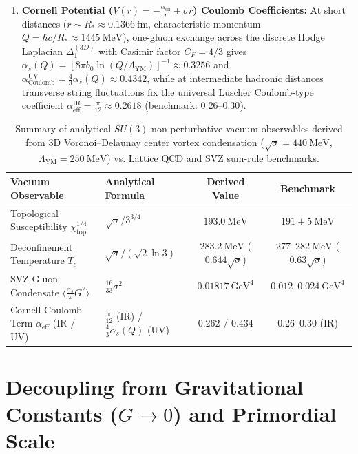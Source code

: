 \documentclass[11pt, a4paper]{article}
\theoremstyle{definition}
\theoremstyle{remark}
\begin{document}
\begin{enumerate}
  \item \textbf{Cornell Potential ($V(r) = -\frac{\alpha_{\mathrm{eff}}}{r} + \sigma r$) Coulomb Coefficients:}
  At short distances ($r \sim R_{*} \approx 0.1366~\mathrm{fm}$, characteristic momentum $Q = \hbar c/R_{*} \approx 1445~\mathrm{MeV}$), one-gluon exchange across the discrete Hodge Laplacian $\Delta_{1}^{(3D)}$ with Casimir factor $C_{F} = 4/3$ gives $\alpha_{s}(Q) = [8\pi b_{0}\ln(Q/\Lambda_{\mathrm{YM}})]^{-1} \approx 0.3256$ and $\alpha_{\mathrm{Coulomb}}^{\mathrm{UV}} = \frac{4}{3}\alpha_{s}(Q) \approx 0.4342$, while at intermediate hadronic distances transverse string fluctuations fix the universal L\"uscher Coulomb-type coefficient $\alpha_{\mathrm{eff}}^{\mathrm{IR}} = \frac{\pi}{12} \approx 0.2618$ (benchmark: $0.26\text{--}0.30$).
\end{enumerate}

\begin{table}[h!]
\centering
\caption{Summary of analytical $SU(3)$ non-perturbative vacuum observables derived from 3D Voronoi--Delaunay center vortex condensation ($\sqrt{\sigma} = 440~\mathrm{MeV}$, $\Lambda_{\mathrm{YM}} = 250~\mathrm{MeV}$) vs. Lattice QCD and SVZ sum-rule benchmarks.}
\vspace{0.5em}
\begin{tabular}{llcc}
\toprule
\textbf{Vacuum Observable} & \textbf{Analytical Formula} & \textbf{Derived Value} & \textbf{Benchmark} \\
\midrule
Topological Susceptibility $\chi_{\mathrm{top}}^{1/4}$ & $\sqrt{\sigma} / 3^{3/4}$ & $193.0~\mathrm{MeV}$ & $191 \pm 5~\mathrm{MeV}$ \\
Deconfinement Temperature $T_{c}$ & $\sqrt{\sigma} / (\sqrt{2}\ln 3)$ & $283.2~\mathrm{MeV}$ ($0.644\sqrt{\sigma}$) & $277\text{--}282~\mathrm{MeV}$ ($0.63\sqrt{\sigma}$) \\
SVZ Gluon Condensate $\langle \frac{\alpha_{s}}{\pi}G^{2}\rangle$ & $\frac{16}{33}\sigma^{2}$ & $0.01817~\mathrm{GeV}^{4}$ & $0.012\text{--}0.024~\mathrm{GeV}^{4}$ \\
Cornell Coulomb Term $\alpha_{\mathrm{eff}}$ (IR / UV) & $\frac{\pi}{12}$ (IR) / $\frac{4}{3}\alpha_{s}(Q)$ (UV) & $0.262$ / $0.434$ & $0.26\text{--}0.30$ (IR) \\
\bottomrule
\end{tabular}
\label{tab:vacuum_observables}
\end{table}

\section{Decoupling from Gravitational Constants ($G \to 0$) and Primordial Scale}
\end{document}
